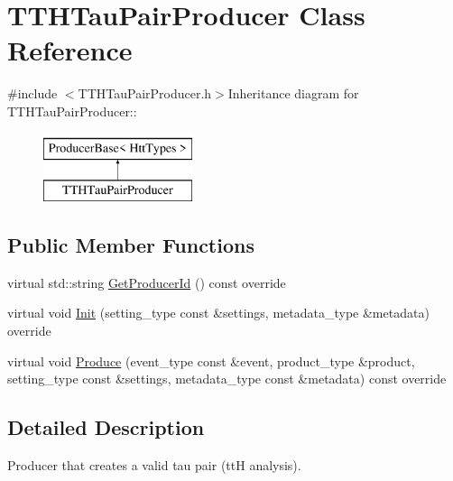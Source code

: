 \hypertarget{classTTHTauPairProducer}{
\section{TTHTauPairProducer Class Reference}
\label{classTTHTauPairProducer}
}


{\ttfamily \#include $<$TTHTauPairProducer.h$>$}Inheritance diagram for TTHTauPairProducer::\begin{figure}[H]
\begin{center}
\leavevmode
\includegraphics[height=2cm]{classTTHTauPairProducer}
\end{center}
\end{figure}
\subsection*{Public Member Functions}
\begin{DoxyCompactItemize}
\item 
virtual std::string \hyperlink{classTTHTauPairProducer_aef3c8c8e85b3b7ed9174521bdf9895cd}{GetProducerId} () const override
\item 
virtual void \hyperlink{classTTHTauPairProducer_a5b7682157f545adaf9a449e2507321e9}{Init} (setting\_\-type const \&settings, metadata\_\-type \&metadata) override
\item 
virtual void \hyperlink{classTTHTauPairProducer_aaf6b62a254a117838bc6a46525df61d8}{Produce} (event\_\-type const \&event, product\_\-type \&product, setting\_\-type const \&settings, metadata\_\-type const \&metadata) const override
\end{DoxyCompactItemize}


\subsection{Detailed Description}
Producer that creates a valid tau pair (ttH analysis). 

